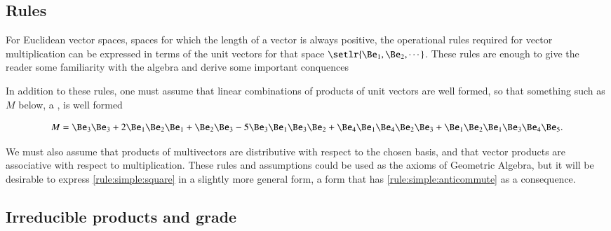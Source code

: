 \subsection{Rules}
For Euclidean vector spaces, spaces for which the length of a vector is always positive, the operational rules required for vector multiplication can be expressed in terms of the unit vectors for that space \( \setlr{ \Be_1, \Be_2, \cdots } \).  These rules are enough to give the reader some familiarity with the algebra and derive some important conquences



In addition to these rules, one must assume that linear combinations of products of unit vectors are well formed, so that something such as \( M \) below, a , is well formed

\begin{equation}\label{eqn:SimpleProducts:20}
M = \Be_3 \Be_3 + 2 \Be_1 \Be_2 \Be_1 + \Be_2 \Be_3 - 5 \Be_3 \Be_1 \Be_3 \Be_2 + \Be_4 \Be_1 \Be_4 \Be_2 \Be_3 + \Be_1 \Be_2 \Be_1 \Be_3 \Be_4 \Be_5.
\end{equation}

We must also assume that products of multivectors are distributive with respect to the chosen basis, and that vector products are associative with respect to multiplication.  These rules and assumptions could be used as the axioms of Geometric Algebra, but it will be desirable to express \ref{rule:simple:square} in a slightly more general form, a form that has \ref{rule:simple:anticommute} as a consequence.

\subsection{Irreducible products and grade}

